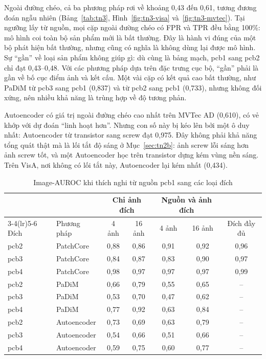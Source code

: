 Ngoài đường chéo, cả ba phương pháp rơi về khoảng 0,43 đến 0,61, tương đương đoán ngẫu nhiên (Bảng~\ref{tab:tn3},
Hình~\ref{fig:tn3-visa} và~\ref{fig:tn3-mvtec}). Tại ngưỡng lấy từ nguồn, mọi cặp ngoài đường chéo có FPR và TPR đều
bằng 100\%: mô hình coi toàn bộ sản phẩm mới là bất thường. Đây là hành vi đúng của một bộ phát hiện bất thường, nhưng
cũng có nghĩa là không dùng lại được mô hình. Sự ``gần'' về loại sản phẩm không giúp gì: dù cùng là bảng mạch, pcb1
sang pcb2 chỉ đạt 0,43--0,48. Với các phương pháp dựa trên đặc trưng cục bộ, ``gần''
phải là gần về bố cục điểm ảnh và kết cấu. Một vài cặp có kết quả cao bất thường, như PaDiM từ pcb3 sang pcb1 (0,837)
và từ pcb2 sang pcb1 (0,733), nhưng không đối xứng, nên nhiều khả năng là trùng hợp về độ tương phản.

Autoencoder có giá trị ngoài đường chéo cao nhất trên MVTec AD (0,610), có vẻ khớp với dự đoán ``linh hoạt hơn''. Nhưng
con số này bị kéo lên bởi một ô duy nhất: Autoencoder từ transistor sang screw đạt 0,975. Đây không phải khả năng tổng
quát thật mà là lối tắt độ sáng ở Mục~\ref{sec:tn2b}: ảnh screw lỗi sáng hơn ảnh screw tốt, và một Autoencoder học trên
transistor dựng kém vùng nền sáng. Trên VisA, nơi không có lối tắt này, Autoencoder lại kém nhất (0,434).

\begin{table}[htbp]
  \centering
  \caption{Image-AUROC khi thích nghi từ nguồn pcb1 sang các loại đích}
  \label{tab:tn3-thich-nghi}
  \small
  \begin{tabular}{@{}llccccc@{}}
    \toprule
    & & \multicolumn{2}{c}{Chỉ ảnh đích} & \multicolumn{2}{c}{Nguồn và ảnh đích} & \\
    \cmidrule(lr){3-4}\cmidrule(lr){5-6}
    Đích & Phương pháp & 4 ảnh & 16 ảnh & 4 ảnh & 16 ảnh & Đích đầy đủ \\
    \midrule
    pcb2 & PatchCore   & 0,88  & 0,86 & 0,91 & 0,92 & 0,96 \\
    pcb3 & PatchCore   & 0,84  & 0,87 & 0,83 & 0,90 & 0,97 \\
    pcb4 & PatchCore   & 0,98  & 0,97 & 0,97 & 0,97 & 0,99 \\
    \midrule
    pcb2 & PaDiM       & 0,66  & 0,79 & 0,55 & 0,65 & -- \\
    pcb3 & PaDiM       & 0,53  & 0,70 & 0,47 & 0,62 & -- \\
    pcb4 & PaDiM       & 0,77  & 0,92 & 0,63 & 0,84 & -- \\
    \midrule
    pcb2 & Autoencoder & 0,73  & 0,69 & 0,63 & 0,79 & -- \\
    pcb3 & Autoencoder & 0,54  & 0,66 & 0,51 & 0,66 & -- \\
    pcb4 & Autoencoder & 0,59  & 0,75 & 0,60 & 0,77 & -- \\
    \bottomrule
  \end{tabular}
\end{table}


